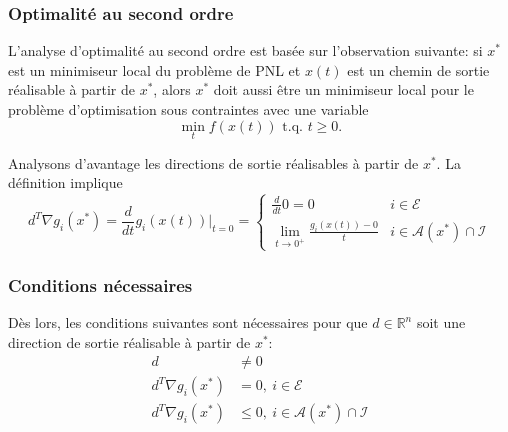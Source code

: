 \documentclass[usepdftitle=false]{beamer}
\def\cA{\mathcal{A}}
\def\cE{\mathcal{E}}
\def\cI{\mathcal{I}}
\def\RR{\mathbb{R}}
\begin{document}
\begin{frame}
\frametitle{Optimalité au second ordre}

L'analyse d'optimalité au second ordre est basée sur l'observation suivante: si $x^*$ est un minimiseur local du problème de PNL et $x(t)$ est un chemin de sortie réalisable à partir de $x^*$, alors $x^*$ doit aussi être un minimiseur local pour le problème d'optimisation sous contraintes avec une variable
$$
\min_t f(x(t)) \mbox{ t.q. } t \geq 0.
$$

\mbox{}

Analysons d'avantage les directions de sortie réalisables à partir de $x^*$.
La définition implique
$$
d^T \nabla g_i(x^*)
= \frac{d}{dt} g_i(x(t)) |_{t = 0}
= \begin{cases}
\frac{d}{dt} 0 = 0 & i \in \cE \\
\lim_{t \rightarrow 0^+} \frac{g_i(x(t))-0}{t} & i \in \cA(x^*) \cap \cI
\end{cases}
$$

\end{frame}

\begin{frame}
\frametitle{Conditions nécessaires}

Dès lors, les conditions suivantes sont nécessaires pour que $d \in \RR^n$ soit une direction de sortie réalisable à partir de $x^*$:
\begin{align*}
d & \ne 0 \\
d^T \nabla g_i(x^*) &= 0,\ i \in \cE \\
d^T \nabla g_i(x^*) &\leq 0,\ i \in \cA(x^*) \cap \cI
\end{align*}

\end{frame}


\end{document}
